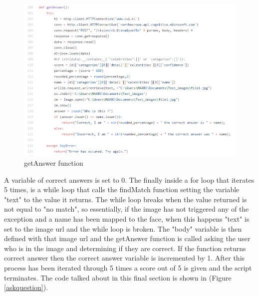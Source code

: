 \documentclass[12pt,a4paper]{article}
\begin{document}
\begin{figure}[h]
    \centering
    \includegraphics[width=1.0\textwidth]{Figs/getanswer.PNG} 
    \caption{getAnswer function} 
    \label{getAnswer}
\end{figure}  

A variable of correct answers is set to 0. The finally inside a for loop that iterates 5 times, is a while loop that calls the findMatch function setting the variable "text" to the value it returns. The while loop breaks when the value returned is not equal to "no match", so essentially, if the image has not triggered any of the exception and a name has been mapped to the face, when this happens "text" is set to the image url and the while loop is broken. The "body" variable is then defined with that image url and the getAnswer function is called asking the user who is in the image and determining if they are correct. If the function returns correct answer then the correct answer variable is incremented by 1. After this process has been iterated through 5 times a score out of 5 is given and the script terminates. The code talked about in this final section is shown in (Figure \ref{askquestion}).
\end{document}
